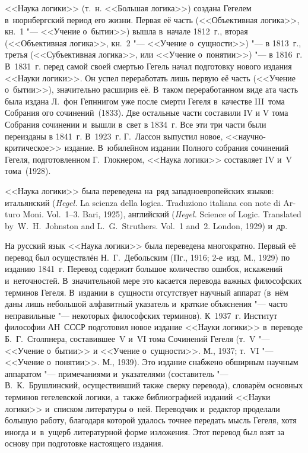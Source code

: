<<Наука логики>> (т.~н. <<Большая логика>>) создана Гегелем в~нюрнбергский
период его жизни. Первая её часть (<<Объективная логика>>, кн.~1 "--- <<Учение
о~бытии>>) вышла в~начале 1812~г., вторая (<<Объективная логика>>, кн.~2 "---
<<Учение о~сущности>>) "--- в 1813~г., третья (<<Субъективная логика>>, или
<<Учение о~понятии>>) "--- в 1816~г. В~1831~г. перед самой своей смертью Гегель
начал подготовку нового издания <<Науки логики>>. Он успел переработать лишь
первую её часть (<<Учение о~бытии>>), значительно расширив её. В~таком
переработанном виде ата часть была издана Л.~фон Гепннигом уже после смерти
Гегеля в~качестве III~тома Собрания ого сочинений~(1833). Две остальные части
составили IV и V тома Собрания сочинении и~вышли в~свет в 1834~г. Все эти три
части были переизданы в 1841~г. В~1923~г. Г.~Лассон выпустил новое,
<<научно-критическое>> издание. В~юбилейном издании Полного собрания сочинений
Гегеля, подготовленном Г.~Глокнером, <<Наука логики>>
составляет IV и~V тома~(1928).

<<Наука логики>> была переведена на~ряд западноевропейских языков: итальянский
\foreignlanguage{italian}{(\textit{Hegel.} La scienza della logica. Traduziono
italiana con note di Arturo Moni. Vol.~1--3. Bari, 1925),} английский
\foreignlanguage{english}{(\textit{Hegel.} Science of Logic. Translated
by~W.~H.~Johnston and L.~G.~Struthers. Vol.~1 and~2. London, 1929)} и~др.

На русский язык <<Наука логики>> была переведена многократно. Первый её перевод
был осуществлён Н.~Г.~Дебольским (Пг., 1916; 2-е~изд. М., 1929) по изданию
1841~г. Перевод содержит большое количество ошибок, искажений и~неточностей.
В~значительной мере это касается перевода важных философских терминов Гегеля.
В~издании в~сущности отсутствует научный аппарат (в~нём даны лишь небольшой
алфавитный указатель и~краткие объяснения "--- часто неправильные "---
некоторых философских терминов). К~1937~г. Институт философии АН~СССР
подготовил новое издание <<Науки логики>> в~переводе Б.~Г.~Столпнера,
составившее~V и~VI тома Сочинений Гегеля (т.~V "--- <<Учение о~бытии>> и
<<Учение о~сущности>>. М., 1937; т.~VI "--- <<Учение о~понятии>>. М., 1939).
Это издание снабжено обширным научным аппаратом "--- примечаниями и~указателями
(составитель "--- В.~К.~Брушлинский, осуществивший также сверку перевода),
словарём основных терминов гегелевской логики, а~также библиографией изданий
<<Науки логики>> и~списком литературы о~ней. Переводчик и~редактор проделали
большую работу, благодаря которой удалось точнее передать мысль Гегеля, хотя
иногда и~в~ущерб литературной форме изложения. Этот перевод был взят за основу
при подготовке настоящего издания.

\bigskip

\begin{center}
~~~~~~
\end{center}

\bigskip

\begin{footnotesize}
\printpagenotes
\end{footnotesize}
